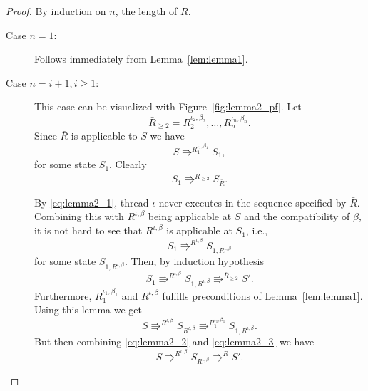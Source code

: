 \begin{proof}
  By induction on $n$, the length of $\bar{R}$.
  \begin{description}
    \item[Case $n = 1$:] Follows immediately from Lemma~\ref{lem:lemma1}.
    \item[Case $n = i+1, i \geq 1$:] This case can be visualized with 
      Figure~\ref{fig:lemma2_pf}. Let
      \begin{equation*}
        \bar{R}_{\geq 2} = R_2^{\iota_2, \beta_2}, \dots, R_n^{\iota_n, \beta_n}.
      \end{equation*}
      Since $\bar{R}$ is applicable to $S$ we have 
      \begin{equation}
        S \Rrightarrow^{R_1^{\iota_1, \beta_1}} S_1,
      \end{equation}
      for some state $S_1$. Clearly
      \begin{equation}
        S_1 \Rrightarrow^{\bar{R}_{\geq 2}} S_{\bar{R}}.
      \end{equation}
      
      By \eqref{eq:lemma2_1}, thread $\iota$ never executes in the sequence
      specified by $\bar{R}$. Combining this with $R^{\iota, \beta}$ being
      applicable at $S$ and the compatibility of $\beta$, it is not hard to see
      that $R^{\iota, \beta}$ is applicable at $S_1$, i.e.,
      \begin{equation}
        S_1 \Rrightarrow^{R^{\iota, \beta}} S_{1,R^{\iota, \beta}}
      \end{equation}
      for some state $S_{1,R^{\iota, \beta}}$. Then, by induction hypothesis
      \begin{equation} \label{eq:lemma2_2}
        S_1 \Rrightarrow^{R^{\iota, \beta}} S_{1,R^{\iota, \beta}} \Rrightarrow^{\bar{R}_{\geq 2}} S'.
      \end{equation}
      Furthermore, $R_1^{\iota_1, \beta_1}$ and $R^{\iota, \beta}$ fulfills
      preconditions of Lemma~\ref{lem:lemma1}. Using this lemma we get
      \begin{equation} \label{eq:lemma2_3}
        S \Rrightarrow^{R^{\iota, \beta}} S_{R^{\iota, \beta}}
        \Rrightarrow^{R_1^{\iota_1, \beta_1}} S_{1, R^{\iota, \beta}}.
      \end{equation}
      But then combining \eqref{eq:lemma2_2} and \eqref{eq:lemma2_3} we have
      \begin{equation}
        S \Rrightarrow^{R^{\iota, \beta}} S_{R^{\iota, \beta}} \Rrightarrow^{\bar{R}} S'.
      \end{equation}
  \end{description}
\end{proof}


